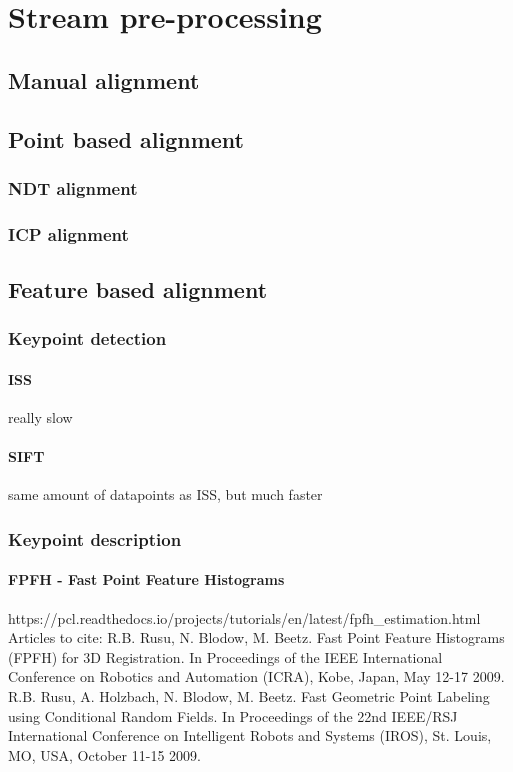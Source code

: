 \section{Stream pre-processing}

\subsection{Manual alignment}

\subsection{Point based alignment}

\subsubsection{NDT alignment}

\subsubsection{ICP alignment}

\subsection{Feature based alignment}

\subsubsection{Keypoint detection}

\paragraph{ISS}

really slow

\paragraph{SIFT}

same amount of datapoints as ISS, but much faster

\subsubsection{Keypoint description}

\paragraph{FPFH - Fast Point Feature Histograms}
https://pcl.readthedocs.io/projects/tutorials/en/latest/fpfh_estimation.html
Articles to cite:
R.B. Rusu, N. Blodow, M. Beetz. Fast Point Feature Histograms (FPFH) for 3D Registration. In Proceedings of the IEEE International Conference on Robotics and Automation (ICRA), Kobe, Japan, May 12-17 2009.
R.B. Rusu, A. Holzbach, N. Blodow, M. Beetz. Fast Geometric Point Labeling using Conditional Random Fields. In Proceedings of the 22nd IEEE/RSJ International Conference on Intelligent Robots and Systems (IROS), St. Louis, MO, USA, October 11-15 2009.

